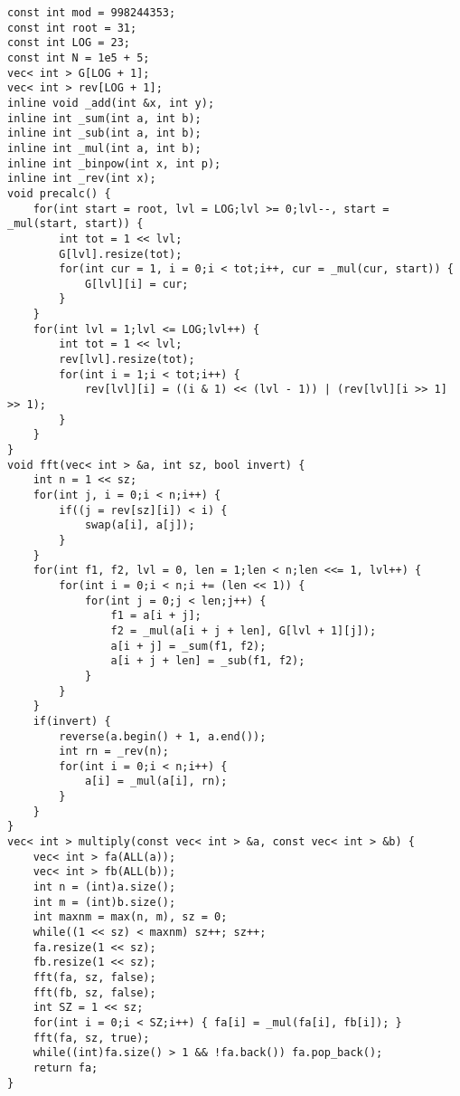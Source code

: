 \documentclass[12pt]{article}
\begin{document}
\begin{verbatim}
const int mod = 998244353;
const int root = 31;
const int LOG = 23;
const int N = 1e5 + 5;
vec< int > G[LOG + 1];
vec< int > rev[LOG + 1];
inline void _add(int &x, int y);
inline int _sum(int a, int b);
inline int _sub(int a, int b);
inline int _mul(int a, int b);
inline int _binpow(int x, int p);
inline int _rev(int x);
void precalc() {
    for(int start = root, lvl = LOG;lvl >= 0;lvl--, start = _mul(start, start)) {
        int tot = 1 << lvl;
        G[lvl].resize(tot);
        for(int cur = 1, i = 0;i < tot;i++, cur = _mul(cur, start)) {
            G[lvl][i] = cur;
        }
    }
    for(int lvl = 1;lvl <= LOG;lvl++) {
        int tot = 1 << lvl;
        rev[lvl].resize(tot);
        for(int i = 1;i < tot;i++) {
            rev[lvl][i] = ((i & 1) << (lvl - 1)) | (rev[lvl][i >> 1] >> 1);
        }
    }
}
void fft(vec< int > &a, int sz, bool invert) {
    int n = 1 << sz;
    for(int j, i = 0;i < n;i++) {
        if((j = rev[sz][i]) < i) {
            swap(a[i], a[j]);
        }
    }
    for(int f1, f2, lvl = 0, len = 1;len < n;len <<= 1, lvl++) {
        for(int i = 0;i < n;i += (len << 1)) {
            for(int j = 0;j < len;j++) {
                f1 = a[i + j];
                f2 = _mul(a[i + j + len], G[lvl + 1][j]);
                a[i + j] = _sum(f1, f2);
                a[i + j + len] = _sub(f1, f2);
            }
        }
    }
    if(invert) {
        reverse(a.begin() + 1, a.end());
        int rn = _rev(n);
        for(int i = 0;i < n;i++) {
            a[i] = _mul(a[i], rn);
        }
    }
}
vec< int > multiply(const vec< int > &a, const vec< int > &b) {
    vec< int > fa(ALL(a));
    vec< int > fb(ALL(b));
    int n = (int)a.size();
    int m = (int)b.size();
    int maxnm = max(n, m), sz = 0;
    while((1 << sz) < maxnm) sz++; sz++;
    fa.resize(1 << sz);
    fb.resize(1 << sz);
    fft(fa, sz, false);
    fft(fb, sz, false);
    int SZ = 1 << sz;
    for(int i = 0;i < SZ;i++) { fa[i] = _mul(fa[i], fb[i]); }
    fft(fa, sz, true);
    while((int)fa.size() > 1 && !fa.back()) fa.pop_back();
    return fa;
}
\end{verbatim}
\end{document}
